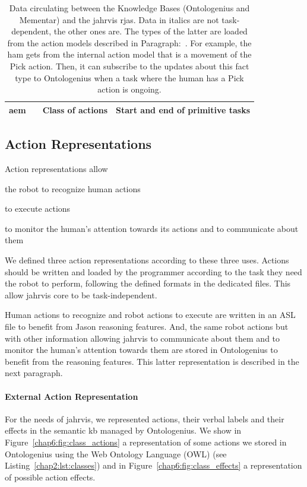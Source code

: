 \documentclass[a4paper,11pt,twoside]{StyleThese}
\begin{document}
\begin{landscape}
\begin{table}[]
\begin{tabular}{p{}||p{}|p{}|p{}|}
		\acrlong{aem} &
		&
		Class of actions &
		Start and end of primitive tasks \\ \hline
		
	\end{tabular}
	\caption{Data circulating between the Knowledge Bases (Ontologenius and Mementar) and the \acrshort{jahrvis} \acrshort{rja}s. Data in italics are not task-dependent, the other ones are. The types of the latter are loaded from the action models described in Paragraph:~. For example, the \acrlong{ham} gets from the internal action model that  is a movement of the Pick action. Then, it can subscribe to the updates about this fact type to Ontologenius when a task where the human has a Pick action is ongoing.}
	\label{chap6:tab:data}
\end{table}
\end{landscape}

\subsection{Action Representations}\label{chap6:subsec:action_rep}
Action representations allow 
\begin{bulletList}
	\item the robot to recognize human actions
	\item to execute actions
	\item to monitor the human's attention towards its actions and to communicate about them
\end{bulletList} 

We defined three action representations according to these three uses. Actions should be written and loaded by the programmer according to the task they need the robot to perform, following the defined formats in the dedicated files. This allow \acrshort{jahrvis} core to be task-independent.

Human actions to recognize and robot actions to execute are written in an ASL file to benefit from Jason reasoning features. And, the same robot actions but with other information allowing \acrshort{jahrvis} to communicate about them and to monitor the human's attention towards them are stored in Ontologenius to benefit from the reasoning features. This latter representation is described in the next paragraph.

\paragraph{External Action Representation}
For the needs of \acrshort{jahrvis}, we represented actions, their verbal labels and their effects in the semantic \acrshort{kb} managed by Ontologenius. We show in Figure~\ref{chap6:fig:class_actions} a representation of some actions we stored in Ontologenius using the Web Ontology Language (OWL) (see Listing~\ref{chap2:lst:classes}) and in Figure~\ref{chap6:fig:class_effects} a representation of possible action effects.
\end{document}
